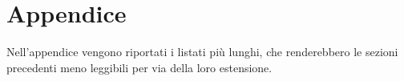 \clearpage
\appendix
\chapter{Appendice}\label{ch:appendix}

Nell'appendice vengono riportati i listati più lunghi, che renderebbero le sezioni precedenti meno leggibili per via della loro estensione.



\clearpage

